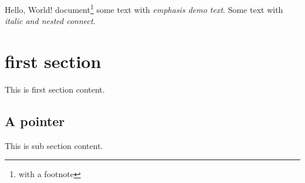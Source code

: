 \documentclass{article}
\begin{document}
Hello, World!
document\footnote{with a footnote}
some text with \emph{emphasis \emph{demo} text}.
Some text with \textit{italic and \textit{nested} connect}.

\section{first section}

This is first section content.

\subsection{A pointer}

This is sub section content.
\end{document}
